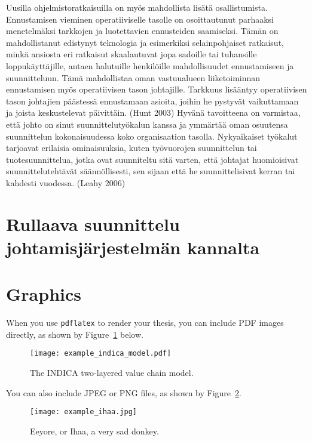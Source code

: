 \documentclass[12pt,a4paper,oneside,pdftex]{report}
\begin{document}
Uusilla ohjelmistoratkaisuilla on myös mahdollista lisätä osallistumista. Ennustamisen vieminen operatiiviselle tasolle on osoittautunut parhaaksi menetelmäksi tarkkojen ja luotettavien ennusteiden saamiseksi. Tämän on mahdollistanut edistynyt teknologia ja esimerkiksi selainpohjaiset ratkaisut, minkä ansiosta eri ratkaisut skaalautuvat jopa sadoille tai tuhansille loppukäyttäjille, antaen halutuille henkilöille mahdollisuudet ennustamiseen ja suunnitteluun. Tämä mahdollistaa oman vastuualueen liiketoiminnan ennustamisen myös operatiivisen tason johtajille. Tarkkuus lisääntyy operatiivisen tason johtajien päästessä ennustamaan asioita, joihin he pystyvät vaikuttamaan ja joista keskustelevat päivittäin. (Hunt 2003) Hyvänä tavoitteena on varmistaa, että johto on sinut suunnittelutyökalun kanssa ja ymmärtää oman osuutensa suunnittelun kokonaisuudessa koko organisaation tasolla. Nykyaikaiset työkalut tarjoavat erilaisia ominaisuuksia, kuten työvuorojen suunnittelun tai tuotesuunnittelua, jotka ovat suunniteltu sitä varten, että johtajat huomioisivat suunnittelutehtävät säännöllisesti, sen sijaan että he suunnittelisivat kerran tai kahdesti vuodessa. (Leahy 2006)

\section{Rullaava suunnittelu johtamisjärjestelmän kannalta}

\section{Graphics}

When you use \texttt{pdflatex} to render your thesis, you can include PDF images
directly, as shown by Figure~\ref{fig:indica_model} below.

\begin{figure}[ht]
  \begin{center}
    \texttt{[image: example\_indica\_model.pdf]}
    \caption{The INDICA two-layered value chain model.}
    \label{fig:indica_model}
  \end{center}
\end{figure}

You can also include JPEG or PNG files, as shown by Figure~\ref{fig:eeyore}.

\begin{figure}[ht]
  \begin{center}
    \texttt{[image: example\_ihaa.jpg]}
    \caption{Eeyore, or Ihaa, a very sad donkey.}
    \label{fig:eeyore}
  \end{center}
\end{figure}
\end{document}
